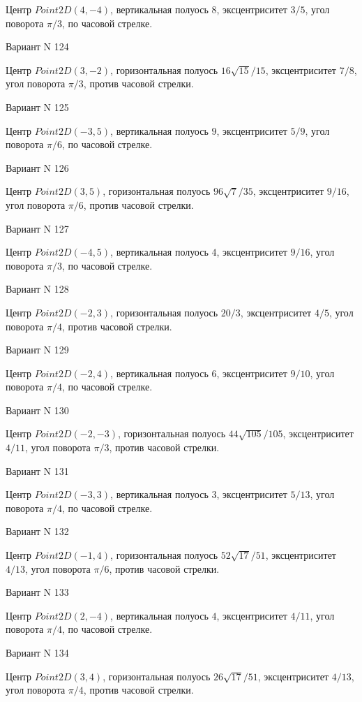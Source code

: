 \documentclass[11pt]{report}
\begin{document}
Центр $Point2D\left(4, -4\right)$, вертикальная полуось $8$, эксцентриситет $3 / 5$, угол поворота $\pi / 3$, по часовой стрелке.

Вариант N 124

Центр $Point2D\left(3, -2\right)$, горизонтальная полуось $16 \sqrt{15} / 15$, эксцентриситет $7 / 8$, угол поворота $\pi / 3$, против часовой стрелки.

Вариант N 125

Центр $Point2D\left(-3, 5\right)$, вертикальная полуось $9$, эксцентриситет $5 / 9$, угол поворота $\pi / 6$, по часовой стрелке.

Вариант N 126

Центр $Point2D\left(3, 5\right)$, горизонтальная полуось $96 \sqrt{7} / 35$, эксцентриситет $9 / 16$, угол поворота $\pi / 6$, против часовой стрелки.

Вариант N 127

Центр $Point2D\left(-4, 5\right)$, вертикальная полуось $4$, эксцентриситет $9 / 16$, угол поворота $\pi / 3$, по часовой стрелке.

Вариант N 128

Центр $Point2D\left(-2, 3\right)$, горизонтальная полуось $20 / 3$, эксцентриситет $4 / 5$, угол поворота $\pi / 4$, против часовой стрелки.

Вариант N 129

Центр $Point2D\left(-2, 4\right)$, вертикальная полуось $6$, эксцентриситет $9 / 10$, угол поворота $\pi / 4$, по часовой стрелке.

Вариант N 130

Центр $Point2D\left(-2, -3\right)$, горизонтальная полуось $44 \sqrt{105} / 105$, эксцентриситет $4 / 11$, угол поворота $\pi / 3$, против часовой стрелки.

Вариант N 131

Центр $Point2D\left(-3, 3\right)$, вертикальная полуось $3$, эксцентриситет $5 / 13$, угол поворота $\pi / 4$, по часовой стрелке.

Вариант N 132

Центр $Point2D\left(-1, 4\right)$, горизонтальная полуось $52 \sqrt{17} / 51$, эксцентриситет $4 / 13$, угол поворота $\pi / 6$, против часовой стрелки.

Вариант N 133

Центр $Point2D\left(2, -4\right)$, вертикальная полуось $4$, эксцентриситет $4 / 11$, угол поворота $\pi / 4$, по часовой стрелке.

Вариант N 134

Центр $Point2D\left(3, 4\right)$, горизонтальная полуось $26 \sqrt{17} / 51$, эксцентриситет $4 / 13$, угол поворота $\pi / 4$, против часовой стрелки.
\end{document}
